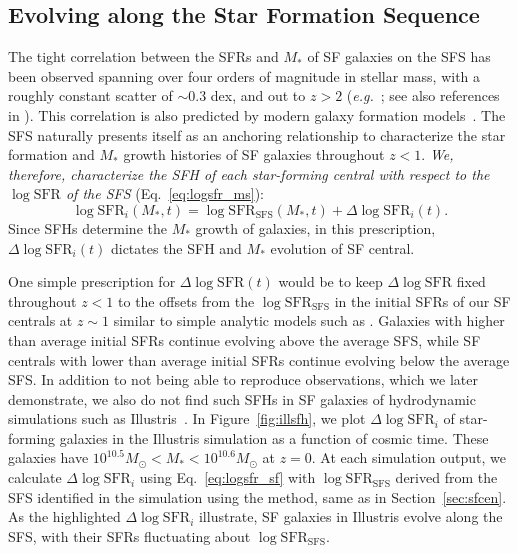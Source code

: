 \documentclass[12pt, letterpaper, preprint, tighten]{aastex62}
\newcommand{\beq}{\begin{equation}}
\newcommand{\eeq}{\end{equation}}
\newcommand{\logsfr}{\log\mathrm{SFR}}
\newcommand{\logsfrsfs}{\log\mathrm{SFR}_\mathrm{SFS}}
\begin{document}
\subsection{Evolving along the Star Formation Sequence} \label{sec:modelevol}
The tight correlation between the SFRs and $M_*$ of SF galaxies on 
the SFS has been observed spanning over four orders of magnitude
in stellar mass, with a roughly constant scatter of ${\sim}0.3$ dex, and out
to $z > 2$
(\emph{e.g.}~\citealt{noeske2007,daddi2007,elbaz2007,salim2007,santini2009,karim2011,whitaker2012,moustakas2013,lee2015}; see also references in \citealt{speagle2014}).
This correlation is also predicted by modern galaxy formation models~\citep[][see
\citealt{hahn2018a} and references therein]{somerville2015}. The SFS
naturally presents itself as an anchoring relationship to characterize
the star formation and $M_*$ growth histories of SF galaxies throughout $z < 1$. 
\emph{We, therefore, characterize the SFH of each star-forming central
with respect to the $\logsfr$ of the SFS} (Eq.~\ref{eq:logsfr_ms}):
\beq \label{eq:logsfr_sf}
\logsfr_i(M_*, t) = \logsfrsfs(M_*, t) + \Delta\logsfr_i(t).
\eeq
Since SFHs determine the $M_*$ growth of galaxies, in this prescription,
$\Delta \logsfr_i(t)$ dictates the SFH and $M_*$ evolution of SF central.

One simple prescription for $\Delta \logsfr(t)$ would be to keep $\Delta \logsfr$
fixed throughout $z < 1$ to the offsets from the $\logsfrsfs$ in the
initial SFRs of our SF centrals at $z\sim1$ similar to simple analytic
models such as \cite{mitra2015}. Galaxies with higher than average
initial SFRs continue evolving above the average SFS, while SF centrals
with lower than average initial SFRs continue evolving below the average
SFS. In addition to not being able to reproduce observations, which we
later demonstrate, we also do not find such SFHs in SF galaxies of
hydrodynamic simulations such as Illustris~\citep{vogelsberger2014,genel2014}.
In Figure~\ref{fig:illsfh}, we plot $\Delta \logsfr_i$ of star-forming
galaxies in the Illustris simulation as a function of cosmic time. These
galaxies have $10^{10.5}M_\odot < M_* < 10^{10.6}M_\odot$ at $z=0$.
At each simulation output, we calculate $\Delta \logsfr_i$ using Eq.~\ref{eq:logsfr_sf}
with $\logsfrsfs$ derived from the SFS identified in the simulation
using the \cite{hahn2018a} method, same as in Section~\ref{sec:sfcen}. As the
highlighted $\Delta \logsfr_i$ illustrate, SF galaxies in Illustris evolve
along the SFS, with their SFRs fluctuating about $\logsfrsfs$.
\end{document}
